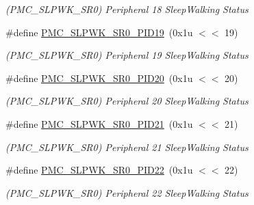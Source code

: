 \begin{DoxyCompactItemize}
\begin{DoxyCompactList}\small\item\em (P\+M\+C\+\_\+\+S\+L\+P\+W\+K\+\_\+\+S\+R0) Peripheral 18 Sleep\+Walking Status \end{DoxyCompactList}\item 
\mbox{\label{group__SAMV71__PMC_ga9fcc0ae06dfed9fc15d2e33f7e4ca0da}} 
\#define \mbox{\hyperlink{group__SAMV71__PMC_ga9fcc0ae06dfed9fc15d2e33f7e4ca0da}{P\+M\+C\+\_\+\+S\+L\+P\+W\+K\+\_\+\+S\+R0\+\_\+\+P\+I\+D19}}~(0x1u $<$$<$ 19)
\begin{DoxyCompactList}\small\item\em (P\+M\+C\+\_\+\+S\+L\+P\+W\+K\+\_\+\+S\+R0) Peripheral 19 Sleep\+Walking Status \end{DoxyCompactList}\item 
\mbox{\label{group__SAMV71__PMC_gaf4e8c136943976671775a545e578f501}} 
\#define \mbox{\hyperlink{group__SAMV71__PMC_gaf4e8c136943976671775a545e578f501}{P\+M\+C\+\_\+\+S\+L\+P\+W\+K\+\_\+\+S\+R0\+\_\+\+P\+I\+D20}}~(0x1u $<$$<$ 20)
\begin{DoxyCompactList}\small\item\em (P\+M\+C\+\_\+\+S\+L\+P\+W\+K\+\_\+\+S\+R0) Peripheral 20 Sleep\+Walking Status \end{DoxyCompactList}\item 
\mbox{\label{group__SAMV71__PMC_ga4c4c2814c433de0b3ae83e8cd1aa08c6}} 
\#define \mbox{\hyperlink{group__SAMV71__PMC_ga4c4c2814c433de0b3ae83e8cd1aa08c6}{P\+M\+C\+\_\+\+S\+L\+P\+W\+K\+\_\+\+S\+R0\+\_\+\+P\+I\+D21}}~(0x1u $<$$<$ 21)
\begin{DoxyCompactList}\small\item\em (P\+M\+C\+\_\+\+S\+L\+P\+W\+K\+\_\+\+S\+R0) Peripheral 21 Sleep\+Walking Status \end{DoxyCompactList}\item 
\mbox{\label{group__SAMV71__PMC_gaa5f77da184e5175a64fd9dd93e0adc7b}} 
\#define \mbox{\hyperlink{group__SAMV71__PMC_gaa5f77da184e5175a64fd9dd93e0adc7b}{P\+M\+C\+\_\+\+S\+L\+P\+W\+K\+\_\+\+S\+R0\+\_\+\+P\+I\+D22}}~(0x1u $<$$<$ 22)
\begin{DoxyCompactList}\small\item\em (P\+M\+C\+\_\+\+S\+L\+P\+W\+K\+\_\+\+S\+R0) Peripheral 22 Sleep\+Walking Status \end{DoxyCompactList}\item 

\end{DoxyCompactItemize}
